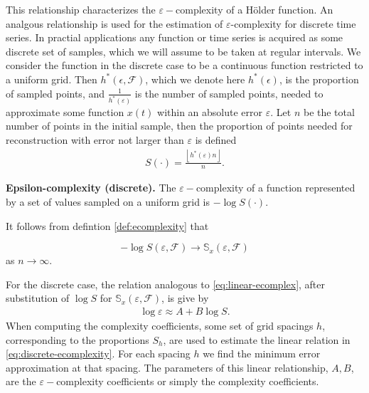   This relationship characterizes the 
  $\varepsilon-$complexity of a H\"older function. An analgous 
  relationship is used 
  for the estimation of $\varepsilon$-complexity for 
  discrete time series.
  In practial applications any function or time series 
  is acquired as some discrete set of samples, which we
  will assume to be taken at regular intervals. We 
  consider the function in the discrete case 
  to be a continuous function
  restricted to a uniform grid. Then 
  $h^*(\epsilon, \mathcal{F})$, which we denote here 
  $h^*(\epsilon)$, is the proportion of sampled points,
  and $\frac{1}{h^*(\varepsilon)}$ is the 
  number of sampled points, 
   needed to approximate some function $x(t)$ within 
  an absolute error $\varepsilon$. Let $n$ be the total number of points 
  in the initial sample, then the 
  proportion of points needed for reconstruction with error not
  larger than $\varepsilon$ is defined 
  \begin{align*}
     S(\cdot)  = \frac{\left\lfloor h^*(\varepsilon)n 
     \right\rfloor }{n}.
   \end{align*} 
   \begin{defn}{\textbf{Epsilon-complexity (discrete).}} 
     The $\varepsilon-$complexity of a function 
     represented by a set of values sampled on 
     a uniform grid is $-\log S(\cdot)$.
   \end{defn}
  It follows from defintion \ref{def:ecomplexity} that
  \begin{prop}
    \[
      -\log S(\varepsilon, \mathcal{F}) \to \mathbb{S}_x(\varepsilon, \mathcal{F}) 
    \]
    as $n \to \infty$.
  \end{prop}
  For the discrete case, the relation analogous to \ref{eq:linear-ecomplex}, after substitution of $\log S$ for $\mathbb{S}_x(\varepsilon, \mathcal{F})$, is give by 
  \begin{align}\label{eq:discrete-ecomplexity}
     \log \varepsilon  \approx A + B \log S.
   \end{align} 
  When computing the complexity coefficients, some set of grid spacings 
  $h$, corresponding to the proportions $S_h$, are used to 
  estimate the linear relation in \ref{eq:discrete-ecomplexity}. 
  For each spacing $h$ we find the minimum error approximation 
  at that spacing.
  The parameters of this linear relationship, $A, B$, are the 
  $\varepsilon-$complexity coefficients or simply the complexity coefficients. 

